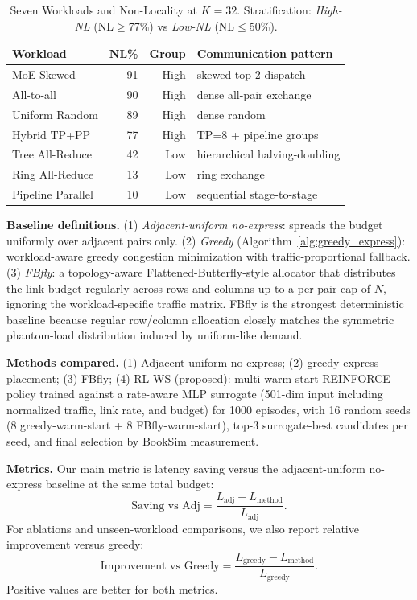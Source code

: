 \documentclass[conference]{IEEEtran}
\begin{document}
\begin{table}[t]
\centering
\caption{Seven Workloads and Non-Locality at $K{=}32$. Stratification: \textit{High-NL} (NL$\ge$77\%) vs \textit{Low-NL} (NL$\le$50\%).}
\label{tab:workloads_full}
\scriptsize
\begin{tabular}{lrrl}
\toprule
Workload & NL\% & Group & Communication pattern \\
\midrule
MoE Skewed & 91 & High & skewed top-2 dispatch \\
All-to-all & 90 & High & dense all-pair exchange \\
Uniform Random & 89 & High & dense random \\
Hybrid TP+PP & 77 & High & TP=8 + pipeline groups \\
\midrule
Tree All-Reduce & 42 & Low & hierarchical halving-doubling \\
Ring All-Reduce & 13 & Low & ring exchange \\
Pipeline Parallel & 10 & Low & sequential stage-to-stage \\
\bottomrule
\end{tabular}
\end{table}

\textbf{Baseline definitions.} (1) \textit{Adjacent-uniform no-express}: spreads the budget uniformly over adjacent pairs only. (2) \textit{Greedy} (Algorithm~\ref{alg:greedy_express}): workload-aware greedy congestion minimization with traffic-proportional fallback. (3) \textit{FBfly}: a topology-aware Flattened-Butterfly-style allocator that distributes the link budget regularly across rows and columns up to a per-pair cap of $N$, ignoring the workload-specific traffic matrix. FBfly is the strongest deterministic baseline because regular row/column allocation closely matches the symmetric phantom-load distribution induced by uniform-like demand.

\textbf{Methods compared.} (1) Adjacent-uniform no-express; (2) greedy express placement; (3) FBfly; (4) RL-WS (proposed): multi-warm-start REINFORCE policy trained against a rate-aware MLP surrogate (501-dim input including normalized traffic, link rate, and budget) for 1000 episodes, with 16 random seeds (8 greedy-warm-start + 8 FBfly-warm-start), top-3 surrogate-best candidates per seed, and final selection by BookSim measurement.

\textbf{Metrics.} Our main metric is latency saving versus the adjacent-uniform no-express baseline at the same total budget:
\begin{equation}
\text{Saving vs Adj} = \frac{L_{\text{adj}} - L_{\text{method}}}{L_{\text{adj}}}.
\end{equation}
For ablations and unseen-workload comparisons, we also report relative improvement versus greedy:
\begin{equation}
\text{Improvement vs Greedy} = \frac{L_{\text{greedy}} - L_{\text{method}}}{L_{\text{greedy}}}.
\end{equation}
Positive values are better for both metrics.
\end{document}
